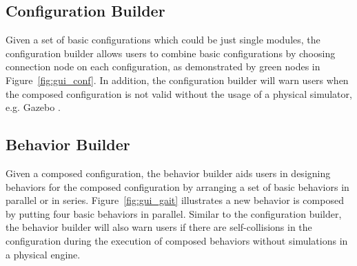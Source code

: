 \documentclass[conference]{IEEEtran}
\theoremstyle{definition}
\begin{document}
\subsection{Configuration Builder}
Given a set of basic configurations which could be just single modules, the configuration builder allows users to combine basic configurations by choosing connection node on each configuration, as demonstrated by green nodes in Figure~\ref{fig:gui_conf}. In addition, the configuration builder will warn users when the composed configuration is not valid without the usage of a physical simulator, e.g. Gazebo
\cite{koenig2004design}.

\subsection{Behavior Builder}
Given a composed configuration, the behavior builder aids users in designing behaviors for the composed configuration by arranging a set of basic behaviors in parallel or in series. Figure~\ref{fig:gui_gait} illustrates a new behavior is composed by putting four basic behaviors in parallel. Similar to the configuration builder, the behavior builder will also warn users if there are self-collisions in the configuration during the execution of composed behaviors without simulations in a physical engine.
\end{document}
